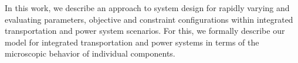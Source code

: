 In this work, we describe an approach to system design for rapidly varying and evaluating parameters, objective and constraint configurations within integrated transportation and power system scenarios. 
For this, we formally describe our model for integrated transportation and power systems in terms of the microscopic behavior of individual components.

